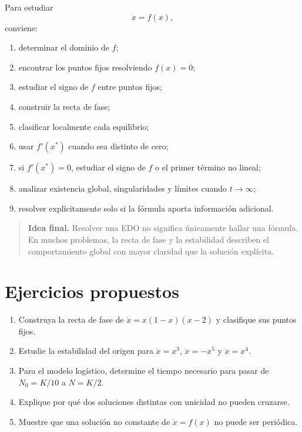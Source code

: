\documentclass[12pt,a4paper]{article}
\begin{document}
	Para estudiar
	\[
	\dot{x}=f(x),
	\]
conviene:
	\begin{enumerate}[label=\arabic*.]
		\item determinar el dominio de \(f\);
		\item encontrar los puntos fijos resolviendo \(f(x)=0\);
		\item estudiar el signo de \(f\) entre puntos fijos;
		\item construir la recta de fase;
		\item clasificar localmente cada equilibrio;
		\item usar \(f'(x^\ast)\) cuando sea distinto de cero;
		\item si \(f'(x^\ast)=0\), estudiar el signo de \(f\) o el primer término no lineal;
		\item analizar existencia global, singularidades y límites cuando \(t\to\infty\);
		\item resolver explícitamente solo si la fórmula aporta información adicional.
	\end{enumerate}

	\begin{quote}
		\textbf{Idea final.} Resolver una EDO no significa únicamente hallar una fórmula. En muchos problemas, la recta de fase y la estabilidad describen el comportamiento global con mayor claridad que la solución explícita.
	\end{quote}

	\section*{Ejercicios propuestos}

	\begin{enumerate}[label=\arabic*.]
		\item Construya la recta de fase de \(\dot{x}=x(1-x)(x-2)\) y clasifique sus puntos fijos.
		\item Estudie la estabilidad del origen para \(\dot{x}=x^3\), \(\dot{x}=-x^5\) y \(\dot{x}=x^4\).
		\item Para el modelo logístico, determine el tiempo necesario para pasar de \(N_0=K/10\) a \(N=K/2\).
		\item Explique por qué dos soluciones distintas con unicidad no pueden cruzarse.
		\item Muestre que una solución no constante de \(\dot{x}=f(x)\) no puede ser periódica.
	\end{enumerate}
\end{document}
